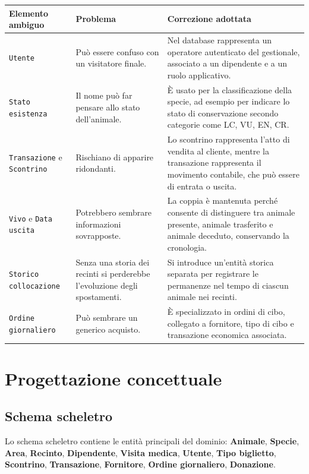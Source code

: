 \documentclass[12pt,a4paper]{report}
\begin{document}
\begin{longtable}{L{4.2cm} L{5cm} L{5.2cm}}
\toprule
\textbf{Elemento ambiguo} & \textbf{Problema} & \textbf{Correzione adottata} \\
\midrule
\endhead
\texttt{Utente} &
Può essere confuso con un visitatore finale. &
Nel database rappresenta un operatore autenticato del gestionale, associato a un dipendente e a un ruolo applicativo. \\

\texttt{Stato esistenza} &
Il nome può far pensare allo stato dell'animale. &
È usato per la classificazione della specie, ad esempio per indicare lo stato di conservazione secondo categorie come LC, VU, EN, CR. \\

\texttt{Transazione} e \texttt{Scontrino} &
Rischiano di apparire ridondanti. &
Lo scontrino rappresenta l'atto di vendita al cliente, mentre la transazione rappresenta il movimento contabile, che può essere di entrata o uscita. \\

\texttt{Vivo} e \texttt{Data uscita} &
Potrebbero sembrare informazioni sovrapposte. &
La coppia è mantenuta perché consente di distinguere tra animale presente, animale trasferito e animale deceduto, conservando la cronologia. \\

\texttt{Storico collocazione} &
Senza una storia dei recinti si perderebbe l'evoluzione degli spostamenti. &
Si introduce un'entità storica separata per registrare le permanenze nel tempo di ciascun animale nei recinti. \\

\texttt{Ordine giornaliero} &
Può sembrare un generico acquisto. &
È specializzato in ordini di cibo, collegato a fornitore, tipo di cibo e transazione economica associata. \\
\bottomrule
\end{longtable}



\chapter{Progettazione concettuale}

\section{Schema scheletro}

Lo schema scheletro contiene le entità principali del dominio:
\textbf{Animale}, \textbf{Specie}, \textbf{Area}, \textbf{Recinto}, \textbf{Dipendente},
\textbf{Visita medica}, \textbf{Utente}, \textbf{Tipo biglietto}, \textbf{Scontrino},
\textbf{Transazione}, \textbf{Fornitore}, \textbf{Ordine giornaliero}, \textbf{Donazione}.
\end{document}
